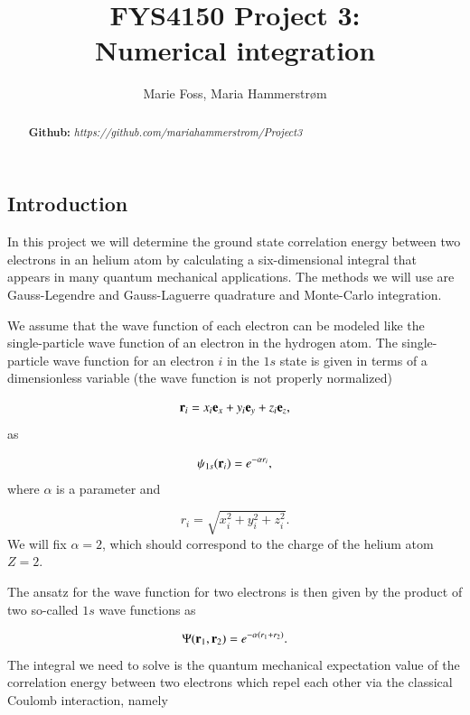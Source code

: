 \documentclass{article}
\title{\textbf{FYS4150 Project 3: \\Numerical integration}}
\author{Marie Foss, Maria Hammerstr{{\o}}m}
\date{} %
\begin{document}
\maketitle

\begin{abstract}
	\noindent \lipsum[1]
	\vspace*{2ex}
	
	\noindent \textbf{Github:} \textit{https://github.com/mariahammerstrom/Project3}
	\vspace*{2ex}
\end{abstract}



\begin{multicols}{2}

\section{Introduction}
In this project we will determine the ground state correlation energy between two electrons in an helium atom by calculating a six-dimensional integral that appears in many quantum mechanical applications. The methods we will use are Gauss-Legendre and Gauss-Laguerre quadrature and Monte-Carlo integration. 

We assume that the wave function of each electron can be modeled like the single-particle wave function of an electron in the hydrogen atom. The single-particle wave function  for an electron $i$ in the $1s$ state  is given in terms of a dimensionless variable    (the wave function is not properly normalized)

\begin{equation*}
	{\bf r}_i =  x_i {\bf e}_x + y_i {\bf e}_y +z_i {\bf e}_z ,
\end{equation*}
as

\begin{equation*}
	\psi_{1s}({\bf r}_i)  =   e^{-\alpha r_i},
\end{equation*}
where $\alpha$ is a parameter and 

\begin{equation*}
	r_i = \sqrt{x_i^2+y_i^2+z_i^2}.
\end{equation*}
We will fix $\alpha=2$, which should correspond to the charge of the helium atom $Z=2$. 

The ansatz for the wave function for two electrons is then given by the product of two 
so-called $1s$ wave functions as 

\begin{equation}
	\Psi({\bf r}_1,{\bf r}_2)  =   e^{-\alpha (r_1+r_2)}.
\end{equation}
The integral we need to solve is the quantum mechanical expectation value of the correlation energy between two electrons which repel each other via the classical Coulomb interaction, namely


\end{multicols}
\end{document}
